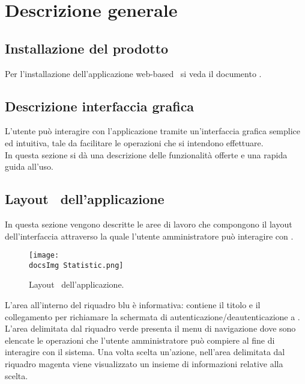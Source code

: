 \section{Descrizione generale}\label{desGen}{

\subsection{Installazione del prodotto}{
Per l'installazione dell'applicazione web-based\g~ si veda il documento \textit{\ManualeInstallatore}.
}

\subsection{Descrizione interfaccia grafica}{
{
L'utente può interagire con l'applicazione \textbf{\mytalk} tramite un'interfaccia grafica semplice ed intuitiva, tale da facilitare le operazioni che si intendono effettuare.\\
In questa sezione si dà una descrizione delle funzionalità offerte e una rapida guida all'uso.
}

\subsection{Layout\g~ dell'applicazione}{
In questa sezione vengono descritte le aree di lavoro che compongono il layout\g~ dell'interfaccia attraverso la quale l'utente amministratore può interagire con \textbf{\mytalk}.
\begin{figure}[h!]
	\centering
	\texttt{[image: \\docsImg Statistic.png]}
	\caption{Layout\g~ dell'applicazione.}
	\label{fig:layoutGen} 
\end{figure}

L'area all'interno del riquadro blu è informativa: contiene il titolo e il collegamento per richiamare la schermata di autenticazione/deautenticazione a \textbf{\mytalk}.\\
L'area delimitata dal riquadro verde presenta il menu di navigazione dove sono elencate le operazioni che l'utente amministratore può compiere al fine di interagire con il sistema. Una volta scelta un'azione, nell'area delimitata dal riquadro magenta viene visualizzato un insieme di informazioni relative alla scelta.
	}
}%

}